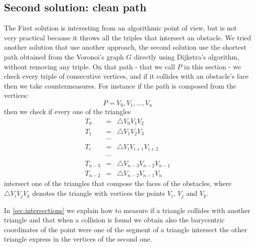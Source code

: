 \documentclass[dissertation.tex]{subfiles}
\begin{document}
\subsection{Second solution: clean path}\label{sec:inter2}
The First solution is interesting from an algorithmic point of view,
but is not very practical because it throws all the triples that
intersect an obstacle. We tried another
solution that use another approach, the second solution use the
shortest path obtained
from the Voronoi's graph $G$ directly using Dijkstra's algorithm,
without removing any triple. On that path
- that we call $P$ in this section - we
check every triple of consecutive vertices, and if it collides with an
obstacle's face then we take countermeasures. For instance if the path
is composed from the vertices:
\begin{equation*}
  P=V_0,V_1,\dots,V_n
\end{equation*}
then we check if every one of the triangles 
\begin{eqnarray*}
T_0 &=& \triangle V_0V_1V_2\\
T_1 &=& \triangle V_1V_2V_3\\
&\cdots&\\
T_i &=& \triangle V_iV_{i+1}V_{i+2}\\
&\cdots&\\
T_{n-3} &=& \triangle V_{n-3}V_{n-2}V_{n-1}\\
T_{n-2} &=& \triangle V_{n-2}V_{n-1}V_n
\end{eqnarray*}
intersect one of the triangles that compose the faces of the
obstacles, where $\triangle V_iV_jV_k$ denotes the triangle with
vertices the points $V_i$, $V_j$ and $V_k$.

In \cref{sec:intersections} we explain how to measure if a triangle
collides with another triangle and that when a collision is found we
obtain also the barycentric coordinates of the point were one of the
segment of a triangle intersect the other triangle express in the
vertices of the second one.
\end{document}
